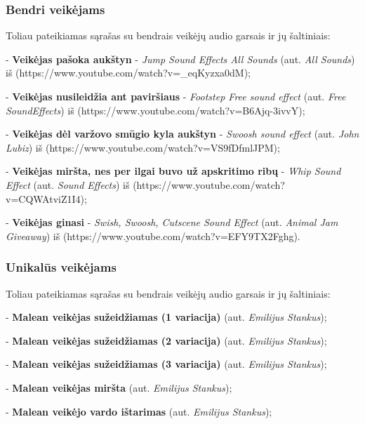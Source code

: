 \documentclass{VUMIFPSkursinis}
\begin{document}
\subsubsection{Bendri veikėjams}
Toliau pateikiamas sąrašas su bendrais veikėjų audio garsais ir jų šaltiniais:
\item - \textbf{Veikėjas pašoka aukštyn} - \textit{Jump Sound Effects All Sounds} (aut. \textit{All Sounds}) iš (https://www.youtube.com/watch?v=\_eqKyzxa0dM);
\item - \textbf{Veikėjas nusileidžia ant paviršiaus} - \textit{Footstep Free sound effect} (aut. \textit{Free SoundEffects}) iš (https://www.youtube.com/watch?v=B6Ajq-3ivvY);
\item - \textbf{Veikėjas dėl varžovo smūgio kyla aukštyn} - \textit{Swoosh sound effect} (aut. \textit{John Lubiz}) iš (https://www.youtube.com/watch?v=VS9fDfmlJPM);
\item - \textbf{Veikėjas miršta, nes per ilgai buvo už apskritimo ribų} - \textit{Whip Sound Effect} (aut. \textit{Sound Effects}) iš (https://www.youtube.com/watch?v=CQWAtviZ1I4);
\item - \textbf{Veikėjas ginasi} - \textit{Swish, Swoosh, Cutscene Sound Effect} (aut. \textit{Animal Jam Giveaway}) iš (https://www.youtube.com/watch?v=EFY9TX2Fghg).


\subsubsection{Unikalūs veikėjams}
Toliau pateikiamas sąrašas su bendrais veikėjų audio garsais ir jų šaltiniais:

\item - \textbf{Malean veikėjas sužeidžiamas (1 variacija)} (aut. \textit{Emilijus Stankus});
\item - \textbf{Malean veikėjas sužeidžiamas (2 variacija)} (aut. \textit{Emilijus Stankus});
\item - \textbf{Malean veikėjas sužeidžiamas (3 variacija)} (aut. \textit{Emilijus Stankus});
\item - \textbf{Malean veikėjas miršta} (aut. \textit{Emilijus Stankus});
\item - \textbf{Malean veikėjo vardo ištarimas} (aut. \textit{Emilijus Stankus});
\end{document}
